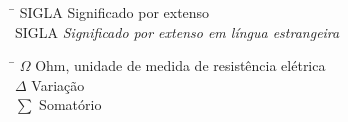 \newpage
{}
\printlist{\listoffigures}

\newpage
{}
\printlist{\listoftables}

\newpage
{}
\printlist{\listofdatatables}

\newpage
{}

\begin{tabbing}
    \hspace{3cm}\=\kill
    SIGLA \> Significado por extenso\\
    SIGLA \> \textit{Significado por extenso em língua estrangeira}\\
\end{tabbing}

\newpage
{}

\begin{tabbing}
    \hspace{3cm}\=\kill
    $\Omega$ \> Ohm, unidade de medida de resistência elétrica\\
    $\Delta$ \> Variação\\
    $\sum$ \> Somatório\\
\end{tabbing}

\newpage
{}
\printlist{\tableofcontents}
